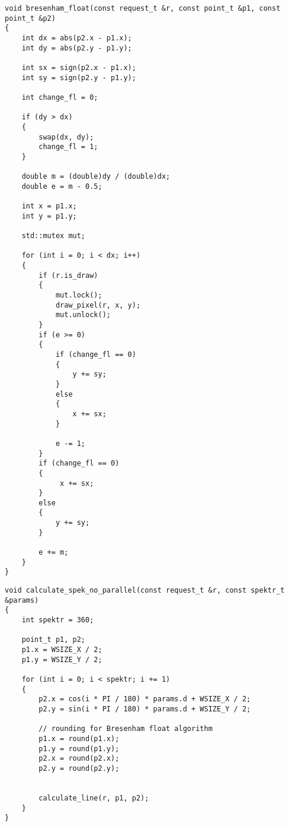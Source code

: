 \captionsetup{singlelinecheck = false, justification=raggedright}
\begin{lstlisting}[caption=Реализация алгоритма Брезенехема для построения отрезка, 
    label={bres_alg}]
void bresenham_float(const request_t &r, const point_t &p1, const point_t &p2)
{
    int dx = abs(p2.x - p1.x);
    int dy = abs(p2.y - p1.y);

    int sx = sign(p2.x - p1.x);
    int sy = sign(p2.y - p1.y);

    int change_fl = 0;

    if (dy > dx)
    {
        swap(dx, dy);
        change_fl = 1;
    }

    double m = (double)dy / (double)dx;
    double e = m - 0.5;

    int x = p1.x;
    int y = p1.y;

    std::mutex mut;

    for (int i = 0; i < dx; i++)
    {
        if (r.is_draw)
        {
            mut.lock();
            draw_pixel(r, x, y);
            mut.unlock();
        }
        if (e >= 0)
        {
            if (change_fl == 0)
            {
                y += sy;
            }
            else
            {
                x += sx;
            }

            e -= 1;
        }
        if (change_fl == 0)
        {
             x += sx;
        }
        else
        {
            y += sy;
        }

        e += m;
    }
}
\end{lstlisting}


\begin{lstlisting}[caption=Реализация алгоритма построения спектра отрезков по Брезенехему без многопоточности,
    label={no_par}]
void calculate_spek_no_parallel(const request_t &r, const spektr_t &params)
{
    int spektr = 360;

    point_t p1, p2;
    p1.x = WSIZE_X / 2;
    p1.y = WSIZE_Y / 2;

    for (int i = 0; i < spektr; i += 1)
    {
        p2.x = cos(i * PI / 180) * params.d + WSIZE_X / 2;
        p2.y = sin(i * PI / 180) * params.d + WSIZE_Y / 2;

        // rounding for Bresenham float algorithm
        p1.x = round(p1.x);
        p1.y = round(p1.y);
        p2.x = round(p2.x);
        p2.y = round(p2.y);


        calculate_line(r, p1, p2);
    }
}
\end{lstlisting}

